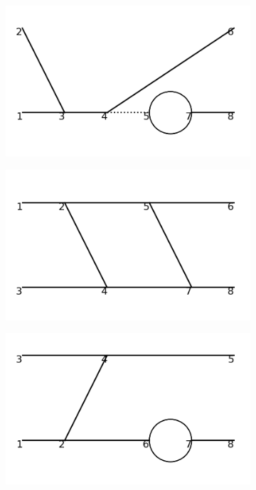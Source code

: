\documentclass[11pt,a4paper,twoside,pdf]{article}
\numberwithin{equation}{section}
\begin{document}
\begin{figure}[h!]
\begin{subfigure}[t]{0.16\textwidth}
    \end{subfigure}
    \hfill
    \begin{subfigure}[t]{0.16\textwidth}
        \centering
        \includegraphics[width=\textwidth]{plots/order4_2to2/22.png}
    \end{subfigure}
    \hfill
    \begin{subfigure}[t]{0.16\textwidth}
        \centering
        \includegraphics[width=\textwidth]{plots/order4_2to2/23.png}
    \end{subfigure}
    \hfill
    \begin{subfigure}[t]{0.16\textwidth}
        \centering
        \includegraphics[width=\textwidth]{plots/order4_2to2/24.png}

\end{subfigure}
\end{figure}
\end{document}
